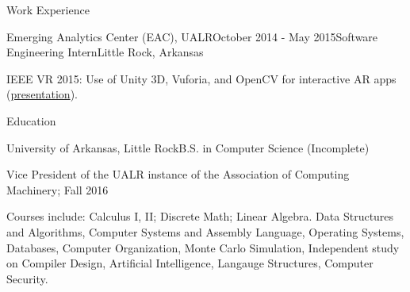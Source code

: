 \documentclass{resume} %
\begin{document}
\begin{rSection}{Work Experience}
\begin{rSubsection}{Emerging Analytics Center (EAC), UALR}{October 2014 - May 2015}{Software Engineering Intern}{Little Rock, Arkansas}
	\item IEEE VR 2015: Use of Unity 3D, Vuforia, and OpenCV for interactive AR apps (\href{http://byteflame.org/ieee_vr/}{presentation}{}).
\end{rSubsection}


\end{rSection}


\begin{rSection}{Education}

\begin{rSubsection}{University of Arkansas, Little Rock}{}{B.S. in Computer Science (Incomplete)}

	\item Vice President of the UALR instance of the Association of Computing Machinery; Fall 2016
	\item Courses include: Calculus I, II; Discrete Math; Linear Algebra. Data Structures and Algorithms, Computer Systems and Assembly Language, Operating Systems, Databases, Computer Organization, Monte Carlo Simulation, Independent study on Compiler Design, Artificial Intelligence, Langauge Structures, Computer Security.
\end{rSubsection}


\end{rSection}
\end{document}
